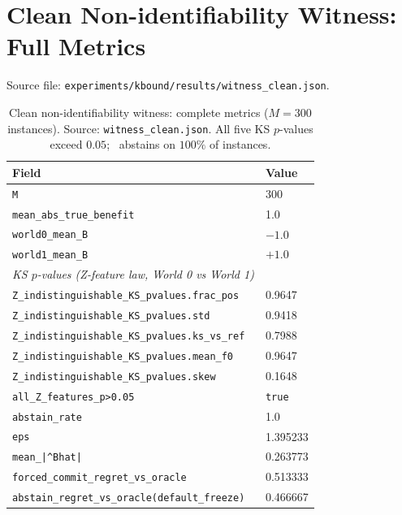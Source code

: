 \section{Clean Non-identifiability Witness: Full Metrics}
\label{sec:app-witness}

Source file: \texttt{experiments/kbound/results/witness\_clean.json}.

\begin{table}[ht]
\centering
\caption{Clean non-identifiability witness: complete metrics ($M = 300$ instances).
  Source: \texttt{witness\_clean.json}.  All five KS $p$-values exceed $0.05$;
  \KGA\ abstains on $100\%$ of instances.}
\label{tab:full-witness}
\begin{tabular}{ll}
\toprule
Field & Value \\
\midrule
\texttt{M}                    & 300 \\
\texttt{mean\_abs\_true\_benefit} & 1.0 \\
\texttt{world0\_mean\_B}      & $-1.0$ \\
\texttt{world1\_mean\_B}      & $+1.0$ \\
\midrule
\textit{KS $p$-values (Z-feature law, World 0 vs World 1)} & \\
\texttt{Z\_indistinguishable\_KS\_pvalues.frac\_pos}   & 0.9647 \\
\texttt{Z\_indistinguishable\_KS\_pvalues.std}         & 0.9418 \\
\texttt{Z\_indistinguishable\_KS\_pvalues.ks\_vs\_ref} & 0.7988 \\
\texttt{Z\_indistinguishable\_KS\_pvalues.mean\_f0}    & 0.9647 \\
\texttt{Z\_indistinguishable\_KS\_pvalues.skew}        & 0.1648 \\
\texttt{all\_Z\_features\_p>0.05}                      & \texttt{true} \\
\midrule
\texttt{abstain\_rate}                            & 1.0 \\
\texttt{eps}                                      & 1.395233 \\
\texttt{mean\_|\textasciicircum{}Bhat|}            & 0.263773 \\
\texttt{forced\_commit\_regret\_vs\_oracle}        & 0.513333 \\
\texttt{abstain\_regret\_vs\_oracle(default\_freeze)} & 0.466667 \\
\bottomrule
\end{tabular}
\end{table}

